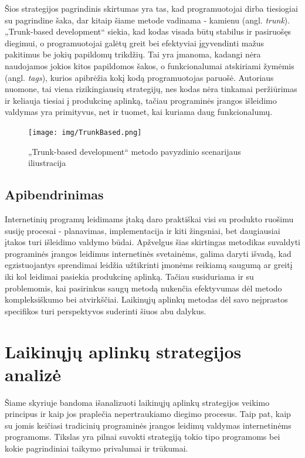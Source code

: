 \documentclass{VUMIFPSkursinis}
\begin{document}

Šios strategijos pagrindinis skirtumas yra tas, kad programuotojai dirba tiesiogiai su pagrindine šaka, dar kitaip šiame metode vadinama - kamienu (angl. \textit{trunk}). „Trunk-based development“ siekia, kad kodas visada būtų stabilus ir pasiruošęs diegimui, o programuotojai galėtų greit bei efektyviai įgyvendinti mažus pakitimus be jokių papildomų trikdžių. Tai yra įmanoma, kadangi nėra naudojamos jokios kitos papildomos šakos, o funkcionalumai atskiriami žymėmis (angl. \textit{tags}), kurios apibrėžia kokį kodą programuotojas paruošė. Autoriaus nuomone, tai viena rizikingiausių strategijų, nes kodas nėra tinkamai peržiūrimas ir keliauja tiesiai į produkcinę aplinką, tačiau programinės įrangos išleidimo valdymas yra primityvus, net ir tuomet, kai kuriama daug funkcionalumų.

\begin{figure}[H]
    \centering
    \texttt{[image: img/TrunkBased.png]}
    \caption{„Trunk-based development“ metodo pavyzdinio scenarijaus iliustracija}
    \label{img:mlp}
\end{figure}

\subsection{Apibendrinimas}
Internetinių programų leidimams įtaką daro praktiškai visi su produkto ruošimu susiję procesai - planavimas, implementacija ir kiti žingsniai, bet daugiausiai įtakos turi išleidimo valdymo būdai. Apžvelgus šias skirtingas metodikas suvaldyti programinės įrangos leidimus internetinės svetainėms, galima daryti išvadą, kad egzistuojantys sprendimai leidžia užtikrinti įmonėms reikiamą saugumą ar greitį iki kol leidimai pasiekia produkcinę aplinką. Tačiau susiduriama ir su problemomis, kai pasirinkus saugų metodą nukenčia efektyvumas dėl metodo kompleksiškumo bei atvirkščiai. Laikinųjų aplinkų metodas dėl savo neįprastos specifikos turi perspektyvos suderinti šiuos abu dalykus. 

\section{Laikinųjų aplinkų strategijos analizė}

Šiame skyriuje bandoma išanalizuoti laikinųjų aplinkų strategijos veikimo principus ir kaip jos praplečia nepertraukiamo diegimo procesus. Taip pat, kaip su jomis keičiasi tradicinių programinės įrangos leidimų valdymas internetinėms programoms. Tikslas yra pilnai suvokti strategiją tokio tipo programoms bei kokie pagrindiniai taikymo privalumai ir trūkumai.
\end{document}
